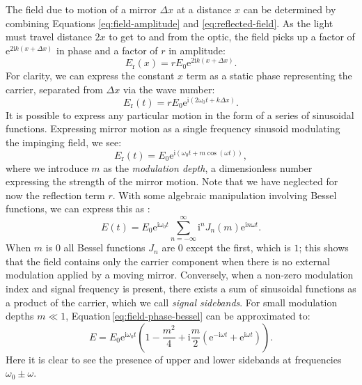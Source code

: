 The field due to motion of a mirror $\Delta x$ at a distance $x$ can be determined by combining Equations \ref{eq:field-amplitude} and \ref{eq:reflected-field}. As the light must travel distance $2x$ to get to and from the optic, the field picks up a factor of $\text{e}^{2\text{i}k \left( x + \Delta x \right)}$ in phase and a factor of $r$ in amplitude:
\begin{equation}
  E_{\text{r}} \left( x \right) = r E_0 \text{e}^{2\text{i} k \left( x + \Delta x \right)}.
\end{equation}
For clarity, we can express the constant $x$ term as a static phase representing the carrier, separated from $\Delta x$ via the wave number:
\begin{equation}
  \label{eq:field-amplitude-phase}
  E_{\text{r}} \left( t \right) = r E_0 \text{e}^{\text{i} \left( 2 \omega_0 t + k \Delta x\right)}.
\end{equation}
It is possible to express any particular motion in the form of a series of sinusoidal functions. Expressing mirror motion as a single frequency sinusoid modulating the impinging field, we see:
\begin{equation}
  \label{eq:field-phase-modulation}
  E_{\text{r}} \left( t \right) = E_0 \text{e}^{\text{i} \left(\omega_0 t + m \cos{\left( \omega t \right)} \right)},
\end{equation}
where we introduce $m$ as the \emph{modulation depth}, a dimensionless number expressing the strength of the mirror motion. Note that we have neglected for now the reflection term $r$. With some algebraic manipulation involving Bessel functions, we can express this as \cite{Freise2010}:
\begin{equation}
  \label{eq:field-phase-bessel}
  E \left( t \right) = E_0 \text{e}^{\text{i} \omega_0 t} \sum^{\infty}_{n=-\infty} \text{i}^n J_{n} \left( m \right) \text{e}^{\text{i} n \omega t}.
\end{equation}
When $m$ is $0$ all Bessel functions $J_{n}$ are $0$ except the first, which is $1$; this shows that the field contains only the carrier component when there is no external modulation applied by a moving mirror. Conversely, when a non-zero modulation index and signal frequency is present, there exists a sum of sinusoidal functions as a product of the carrier, which we call \emph{signal sidebands}. For small modulation depths $m \ll 1$, Equation\,\ref{eq:field-phase-bessel} can be approximated to:
\begin{equation}
  \label{eq:field-phase-mod-expanded}
  E = E_0 \text{e}^{\text{i} \omega_0 t} \left( 1 - \frac{m^2}{4} + \text{i} \frac{m}{2} \left( \text{e}^{-\text{i} \omega t} + \text{e}^{\text{i} \omega t} \right) \right).
\end{equation}
Here it is clear to see the presence of upper and lower sidebands at frequencies $\omega_0 \pm \omega$.


